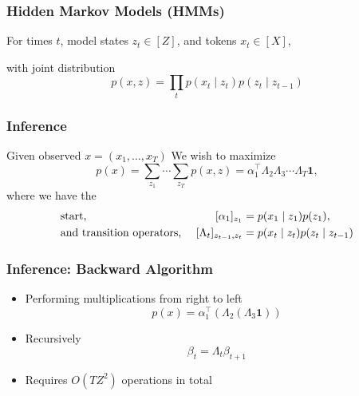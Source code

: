 \documentclass{beamer}
\begin{document}
\begin{frame}
\frametitle{Hidden Markov Models (HMMs)}

For times $t$, model states $z_t \in [Z]$, and tokens $x_t \in [X]$,

\vspace{1em}

\begin{center}
\end{center}

\vspace{1em}
with joint distribution
$$p(x,z) = \prod_t p(x_t \mid z_t)p(z_t \mid z_{t-1})$$
\end{frame}

\begin{frame}
\frametitle{Inference}
Given observed $x = (x_1, \ldots, x_T)$
\vspace{1em}
We wish to maximize
\begin{equation*}
p(x)
= \sum_{z_1}\cdots\sum_{z_T}p(x, z)
= \alpha_1^\top\Lambda_2\Lambda_3\cdots\Lambda_T\bm1,
\end{equation*}
where we have the
\begin{align*}
&\textnormal{start, } & [\alpha_1]_{z_1} &= p(x_1\mid z_1)p(z_1),\\
&\textnormal{and transition operators, }
    & [\Lambda_t]_{z_{t-1},z_t} &= p(x_t \mid z_t)p(z_t \mid z_{t-1})
\end{align*}

\end{frame}

\begin{frame}
\frametitle{Inference: Backward Algorithm}
\begin{itemize}
\item Performing multiplications from right to left
\begin{equation*}
p(x)
= \alpha_1^\top(\Lambda_2(\Lambda_3\bm1))
\end{equation*}
\item Recursively
$$\beta_{t} = \Lambda_t\beta_{t+1}$$
\item Requires $O(TZ^2)$ operations in total
\end{itemize}
\end{frame}
\end{document}
